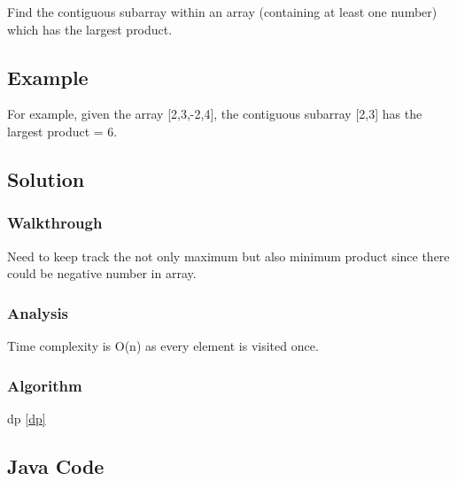 \documentclass[]{book}
\begin{document}
Find the contiguous subarray within an array (containing at least one number) which has the largest product.

\hypertarget{example-26}{%
\subsection{Example}\label{example-26}}

For example, given the array {[}2,3,-2,4{]}, the contiguous subarray {[}2,3{]} has the largest product = 6.

\hypertarget{solution-21}{%
\subsection{Solution}\label{solution-21}}

\hypertarget{walkthrough-25}{%
\subsubsection{Walkthrough}\label{walkthrough-25}}

Need to keep track the not only maximum but also minimum product since there could be negative number in array.

\hypertarget{analysis-28}{%
\subsubsection{Analysis}\label{analysis-28}}

Time complexity is O(n) as every element is visited once.

\hypertarget{algorithm-28}{%
\subsubsection{Algorithm}\label{algorithm-28}}

dp \ref{dp}

\hypertarget{java-code-24}{%
\subsection{Java Code}\label{java-code-24}}
\end{document}
